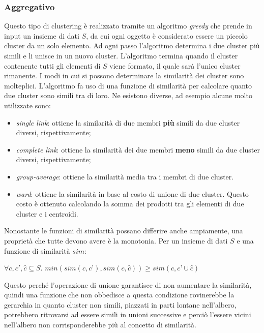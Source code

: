 \documentclass{llncs}
\begin{document}
	\subsubsection{Aggregativo}
	Questo tipo di clustering è realizzato tramite un algoritmo \textit{greedy} che prende in input un insieme di dati $S$, da cui ogni oggetto è considerato essere un piccolo cluster da un solo elemento.
	Ad ogni passo l'algoritmo determina i due cluster più simili e li unisce in un nuovo cluster. L'algoritmo termina
	quando il cluster contenente tutti gli elementi di $S$ viene formato, il quale sarà l'unico cluster rimanente.
	I modi in cui si possono determinare la similarità dei cluster sono molteplici. L'algoritmo fa uso di una funzione di similarità per calcolare quanto due cluster sono simili tra di loro.
	Ne esistono diverse, ad esempio alcune molto utilizzate sono:
	\begin{itemize}
		\item \textit{single link}: ottiene la similarità di due membri \textbf{più} simili da due cluster diversi, rispettivamente;
		\item \textit{complete link}: ottiene la similarità dei due membri \textbf{meno} simili da due cluster diversi, rispettivamente;
		\item \textit{group-average}: ottiene la similarità media tra i membri di due cluster.
		\item \textit{ward}: ottiene la similarità in base al costo di unione di due cluster. Questo costo è ottenuto calcolando la somma dei prodotti tra gli elementi di due cluster e i centroidi. 
	\end{itemize}
	Nonostante le funzioni di similarità possano differire anche ampiamente, una proprietà che tutte devono avere è la monotonia. Per un insieme di dati $S$ e una funzione di similarità $sim$:
	\begin{center}
		$\forall c, c', \hat{c} \subseteq S$. $min(sim(c, c’), sim(c, \hat{c})) \ge sim(c, c’ \cup \hat{c})$
	\end{center}
	Questo perché l'operazione di unione garantisce	di non aumentare la similarità, quindi una funzione che non obbedisce a questa condizione
	rovinerebbe la gerarchia in quanto cluster non simili, piazzati in parti lontane nell'albero, potrebbero
	ritrovarsi ad essere simili in unioni successive e perciò l'essere vicini nell'albero non corrisponderebbe più al concetto di similarità.
\end{document}
